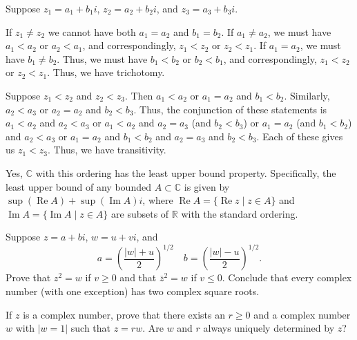 \documentclass[12 pt, letterpaper]{hmcpset}
\begin{document}
\begin{solution}
	Suppose $z_{1} = a_{1} + b_{1}i$, $z_{2} = a_{2} + b_{2}i$, and $z_{3} = a_{3} + b_{3}i$. 

	If $z_{1} \neq z_{2}$ we cannot have both $a_{1} = a_{2}$ and $b_{1} = b_{2}$. If $a_{1} \neq a_{2}$, we must have $a_{1} < a_{2}$ or $a_{2} < a_{1}$, and correspondingly, $z_{1} < z_{2}$ or $z_{2} < z_{1}$. If $a_{1} = a_{2}$, we must have $b_{1} \neq b_{2}$. Thus, we must have $b_{1} < b_{2}$ or $b_{2} < b_{1}$, and correspondingly, $z_{1} < z_{2}$ or $z_{2} < z_{1}$. Thus, we have trichotomy.

	Suppose $z_{1} < z_{2}$ and $z_{2} < z_{3}$. Then $a_{1} < a_{2}$ or $a_{1} = a_{2}$ and $b_{1} < b_{2}$. Similarly, $a_{2} < a_{3}$ or $a_{2} = a_{2}$ and $b_{2} < b_{3}$. Thus, the conjunction of these statements is $a_{1} < a_{2}$ and $a_{2} < a_{3}$ or $a_{1} < a_2$ and $a_{2} = a_{3}$ (and $b_{2} < b_{3}$) or $a_{1} = a_{2}$ (and $b_{1} < b_{2}$) and $a_{2} < a_{3}$ or $a_{1} = a_{2}$ and $b_{1} < b_{2}$ and $a_{2} = a_{3}$ and $b_{2} < b_{3}$. Each of these gives us $z_{1} < z_{3}$. Thus, we have transitivity.

	Yes, $\mathbb{C}$ with this ordering has the least upper bound property. Specifically, the least upper bound of any bounded $A \subset \mathbb{C}$ is given by $\sup(\operatorname{Re} A) + \sup(\operatorname{Im} A) i$, where $\operatorname{Re} A = \{ \operatorname{Re} z \mid z \in A \}$ and $\operatorname{Im} A = \{ \operatorname{Im} A \mid z \in A \}$ are subsets of $\mathbb{R}$ with the standard ordering.
\end{solution}

\pagebreak

\begin{problem}[10.]
	Suppose $z = a + bi$, $w = u + vi$, and
	\[
		a = \left ( \frac{\lvert w \rvert + u}{2} \right )^{1/2} \quad b = \left ( \frac{\lvert w \rvert - u}{2} \right )^{1/2}.
	\]
	Prove that $z^{2} = w$ if $v \ge 0$ and that $\overline{z}^{2} = w$ if $v \le 0$. Conclude that every complex number (with one exception) has two complex square roots.
\end{problem}

\pagebreak

\begin{problem}[11.]
	If $z$ is a complex number, prove that there exists an $r \ge 0$ and a complex number $w$ with $\lvert w = 1 \rvert$ such that $z = r w$. Are $w$ and $r$ always uniquely determined by $z$?
\end{problem}
\end{document}
